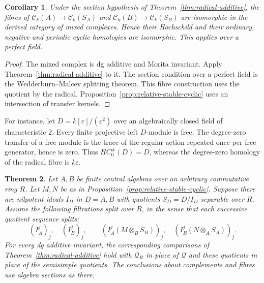 \documentclass[12pt,a4paper,english,reqno]{amsart}
\numberwithin{equation}{section}
\theoremstyle{plain}
\newtheorem{theorem}{Theorem}[section]
\newtheorem{corollary}[theorem]{Corollary}
\theoremstyle{definition}
\begin{document}
\begin{corollary}\label{cor:radical-mixed-complex}
Under the section hypothesis of Theorem~\ref{thm:radical-additive},
the fibres of $\mathcal C_k(A)\to\mathcal C_k(S_A)$ and
$\mathcal C_k(B)\to\mathcal C_k(S_B)$ are isomorphic in the
derived category of mixed complexes. Hence their Hochschild
and their ordinary, negative and periodic cyclic homologies
are isomorphic. This applies over a perfect field.
\end{corollary}

\begin{proof}
The mixed complex is dg additive and Morita invariant.
Apply Theorem~\ref{thm:radical-additive} to it. The section
condition over a perfect field is the Wedderburn--Malcev
splitting theorem. This fibre construction uses the quotient
by the radical. Proposition~\ref{prop:relative-stable-cyclic}
uses an intersection of transfer kernels.
\end{proof}

For instance, let $D=k[\varepsilon]/(\varepsilon^2)$ over an
algebraically closed field of characteristic $2$. Every finite
projective left $D$-module is free. The degree-zero transfer
of a free module is the trace of the regular action repeated
once per free generator, hence is zero. Thus $HC_0^{\mathrm{st}}(D)=D$,
whereas the degree-zero homology of the radical fibre is
$k\varepsilon$.

\begin{theorem}\label{thm:relative-nilpotent-additive}
Let $A,B$ be finite central algebras over an arbitrary
commutative ring $R$. Let $M,N$ be as in
Proposition~\ref{prop:relative-stable-cyclic}. Suppose there
are nilpotent ideals $I_D$ in $D=A,B$ with quotients
$S_D=D/I_D$ separable over $R$. Assume the following
filtrations split over $R$, in the sense that each successive
quotient sequence splits:
\[
 (I_A^j)_j,\quad (I_B^j)_j,\qquad
 (I_A^j(M\otimes_B S_B))_j,\quad
 (I_B^j(N\otimes_A S_A))_j.
\]
For every dg additive invariant, the corresponding
comparisons of Theorem~\ref{thm:radical-additive} hold with
$\mathcal Q_R$ in place of $\mathcal Q$ and these quotients
in place of the semisimple quotients. The conclusions about
complements and fibres use algebra sections as there.
\end{theorem}
\end{document}
